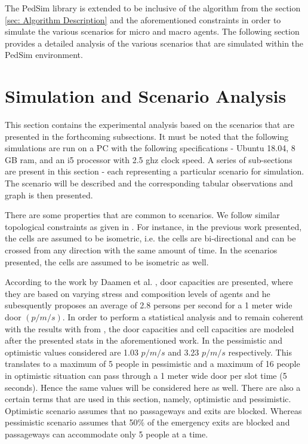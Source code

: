 The PedSim library is extended to be inclusive of the algorithm from the section \ref{sec: Algorithm Description} and the aforementioned constraints in order to simulate the various scenarios for micro and macro agents. The following section provides a detailed analysis of the various scenarios that are simulated within the PedSim environment.  

\section{Simulation and Scenario Analysis}
\label{sec: Simulation and Scenario Analysis}

This section contains the experimental analysis based on the scenarios that are presented in the forthcoming subsections. It must be noted that the following simulations are run on a PC with the following specifications - Ubuntu 18.04, 8 GB ram, and an i5 processor with 2.5 ghz clock speed. A series of sub-sections are present in this section - each representing a particular scenario for simulation. The scenario will be described and the corresponding tabular observations and graph is then presented. 

There are some properties that are common to scenarios. We follow similar topological constraints as given in \cite{ref5}. For instance, in the previous work presented, the cells are assumed to be isometric, i.e. the cells are bi-directional and can be crossed from any direction with the same amount of time. In the scenarios presented, the cells are assumed to be isometric as well.

According to the work by Daamen et al. \cite{ref23}, door capacities are presented, where they are based on varying stress and composition levels of agents and he subesquently proposes an average of 2.8 persons per second for a 1 meter wide door $(p/m/s)$. In order to perform a statistical analysis and to remain coherent with the results with from \cite{ref5}, the door capacities and cell capacities are modeled after the presented stats in the aforementioned work. In \cite{ref5} the pessimistic and optimistic values considered are 1.03 $p/m/s$ and 3.23 $p/m/s$ respectively. This translates to a maximum of 5 people in pessimistic and a maximum of 16 people in optimistic situation can pass through a 1 meter wide door per slot time (5 seconds). Hence the same values will be considered here as well. There are also a certain terms that are used in this section, namely, optimistic and pessimistic. Optimistic scenario assumes that no passageways and exits are blocked. Whereas pessimistic scenario assumes that 50\% of the emergency exits are blocked and passageways can accommodate only 5 people at a time. 

